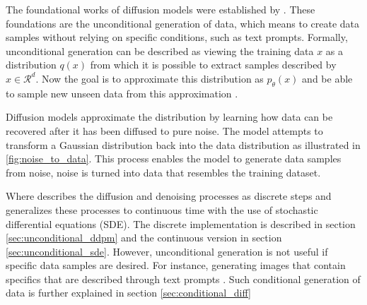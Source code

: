 The foundational works of diffusion models were established by \textcite{ho_denoising_2020, song_score-based_2021}. These foundations are the unconditional generation of data, which means to create data samples without relying on specific conditions, such as text prompts.
Formally, unconditional generation can be described as viewing the training data ${x}$ as a distribution $q(x)$ from which it is possible to extract samples described by $x \in \mathcal{R}^d$. Now the goal is to approximate this distribution as $p_\theta(x)$ and be able to sample new unseen data from this approximation \cite{luo_understanding_2022}.

Diffusion models approximate the distribution by learning how data can be recovered after it has been diffused to pure noise. The model attempts to transform a Gaussian distribution back into the data distribution as illustrated in \autoref{fig:noise_to_data}. This process enables the model to generate data samples from noise, noise is turned into data that resembles the training dataset.

Where \textcite{ho_denoising_2020} describes the diffusion and denoising processes as discrete steps and \textcite{song_score-based_2021} generalizes these processes to continuous time with the use of stochastic differential equations (SDE). The discrete implementation is described in section \ref{sec:unconditional_ddpm} and the continuous version in section \ref{sec:unconditional_sde}.
However, unconditional generation is not useful if specific data samples are desired. For instance, generating images that contain specifics that are described through text prompts \cite{rombach_high-resolution_2022}. Such conditional generation of data is further explained in section \ref{sec:conditional_diff}

